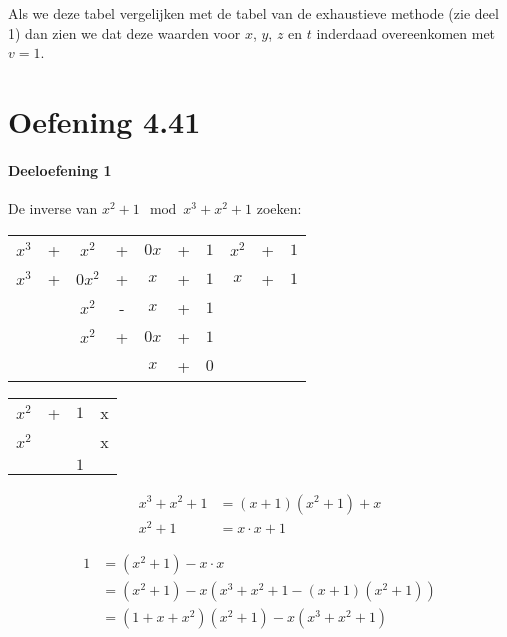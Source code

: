 \documentclass[12pt]{article}
\begin{document}
Als we deze tabel vergelijken met de tabel van de exhaustieve methode (zie deel 1) dan zien we dat deze waarden voor $x$, $y$, $z$ en $t$ inderdaad overeenkomen met $v=1$.

\newpage

\section{Oefening 4.41}
\paragraph{Deeloefening 1}
	
	\par De inverse van $x^{2}+1 \mod x^{3}+x^{2}+1$ zoeken:

	\begin{table}[H]
	\centering
	\begin{tabular}{ccccccc|ccc}
		$x^{3}$&+&$x^{2}$&+&$0x$&+&$1$&$x^{2}$&+&$1$ \\
		\cline{8-10}
		$x^{3}$&+&$0x^{2}$&+&$x$&+&$1$&$x$&+&$1$ \\
		\cline{1-7}
		 & &$x^{2}$&-&$x$&+&$1$& & & \\
		 & &$x^{2}$&+&$0x$&+&$1$& & & \\
		\cline{3-7}
		 & & & &$x$&+&$0$& & & \\ 

	\end{tabular}
	\end{table}

	\begin{table}[H]
	\centering
	\begin{tabular}{ccc|c}
		$x^{2}$&+&$1$&x \\
		\cline{4-4}
		$x^{2}$& & &x \\
		\cline{1-3}
		 & &$1$& \\
	\end{tabular}
	\end{table}

	\begin{align}
		x^{3}+x^{2}+1 &= (x+1)(x^{2}+1)+x \\
		x^{2}+1 &= x\cdot x+1
	\end{align}

	\begin{align}
		1 &= (x^{2}+1)-x\cdot x \\
		&= (x^{2}+1)-x(x^{3}+x^{2}+1-(x+1)(x^{2}+1))\\
		&= (1+x+x^{2})(x^{2}+1)-x(x^{3}+x^{2}+1)\\
	\end{align}
\end{document}
